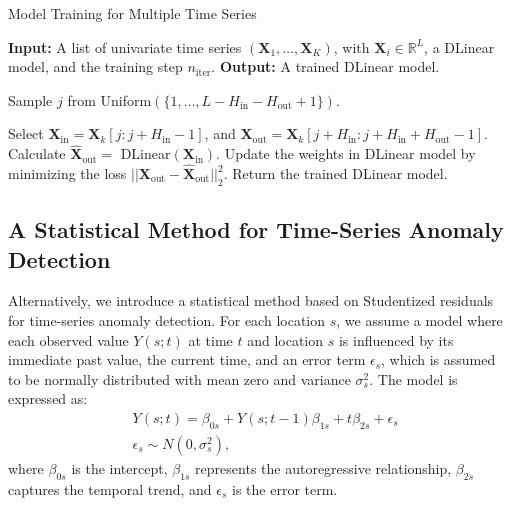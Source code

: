 \documentclass[11pt]{article}
\begin{document}
\begin{algorithm}
\caption{Model Training for Multiple Time Series}\label{alg: nn training for multiple time series}
\begin{algorithmic}[1] %
\State \textbf{Input:} A list of univariate time series $(\bm{X}_1,\ldots,\bm{X}_K)$, with $\bm{X}_i \in \mathbb{R}^L$, a DLinear model, and the training step $n_{\mathrm{iter}}$.
\State \textbf{Output:} A trained DLinear model.

    \State Sample $j$ from Uniform$(\{1, \ldots, L-H_{\mathrm{in}}-H_{\mathrm{out}}+1\})$.

    \State Select $\bm{X}_{\mathrm{in}} = \bm{X}_k[j:j+H_{\mathrm{in}}-1]$, and $\bm{X}_{\mathrm{out}} = \bm{X}_k[j+H_{\mathrm{in}}:j+H_{\mathrm{in}}+H_{\mathrm{out}}-1]$.
    \State Calculate $\hat{\bm{X}}_{\mathrm{out}} =$ DLinear$(\bm{X}_{\mathrm{in}})$.
    \State Update the weights in DLinear model by minimizing the loss $||\bm{X}_{\mathrm{out}} - \hat{\bm{X}}_{\mathrm{out}}||^2_2$.
    \EndFor
\EndFor
\State Return the trained DLinear model.
\end{algorithmic}
\end{algorithm}





\subsection{A Statistical Method for Time-Series Anomaly Detection}\label{sec:Outlier Detection for Individual Location}
Alternatively, we introduce a statistical method based on Studentized residuals for time-series anomaly detection. For each location $s$, we assume a model where each observed value $Y(s;t)$ at time $t$ and location $s$ is influenced by its immediate past value, the current time, and an error term $\epsilon_s$, which is assumed to be normally distributed with mean zero and variance $\sigma_s^2$. The model is expressed as:
\begin{align}
	&Y(s;t) = \beta_{0s} + Y(s;t-1)\beta_{1s} + t\beta_{2s}+\epsilon_s \\
	&\epsilon_s \sim N(0,\sigma_s^2) \nonumber,
\end{align}
	where $\beta_{0s}$ is the intercept, $\beta_{1s}$ represents the autoregressive relationship, $\beta_{2s}$ captures the temporal trend, and $\epsilon_s$ is the error term.
	
\end{document}
